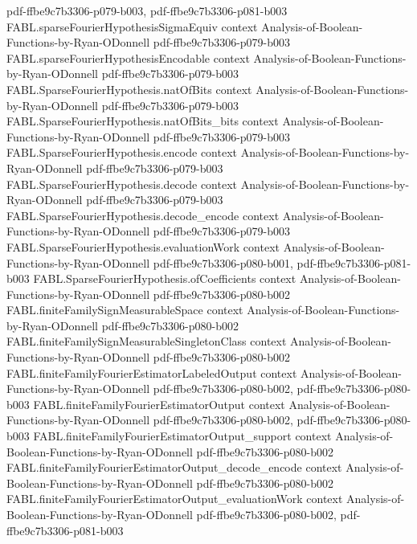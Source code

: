 \begin{theorem}
  {pdf-ffbe9c7b3306-p079-b003,
    pdf-ffbe9c7b3306-p081-b003}
\proofstep
  {FABL.sparseFourierHypothesisSigmaEquiv}
  {context}
  {Analysis-of-Boolean-Functions-by-Ryan-ODonnell}
  {pdf-ffbe9c7b3306-p079-b003}
\proofstep
  {FABL.sparseFourierHypothesisEncodable}
  {context}
  {Analysis-of-Boolean-Functions-by-Ryan-ODonnell}
  {pdf-ffbe9c7b3306-p079-b003}
\proofstep
  {FABL.SparseFourierHypothesis.natOfBits}
  {context}
  {Analysis-of-Boolean-Functions-by-Ryan-ODonnell}
  {pdf-ffbe9c7b3306-p079-b003}
\proofstep
  {FABL.SparseFourierHypothesis.natOfBits_bits}
  {context}
  {Analysis-of-Boolean-Functions-by-Ryan-ODonnell}
  {pdf-ffbe9c7b3306-p079-b003}
\proofstep
  {FABL.SparseFourierHypothesis.encode}
  {context}
  {Analysis-of-Boolean-Functions-by-Ryan-ODonnell}
  {pdf-ffbe9c7b3306-p079-b003}
\proofstep
  {FABL.SparseFourierHypothesis.decode}
  {context}
  {Analysis-of-Boolean-Functions-by-Ryan-ODonnell}
  {pdf-ffbe9c7b3306-p079-b003}
\proofstep
  {FABL.SparseFourierHypothesis.decode_encode}
  {context}
  {Analysis-of-Boolean-Functions-by-Ryan-ODonnell}
  {pdf-ffbe9c7b3306-p079-b003}
\proofstep
  {FABL.SparseFourierHypothesis.evaluationWork}
  {context}
  {Analysis-of-Boolean-Functions-by-Ryan-ODonnell}
  {pdf-ffbe9c7b3306-p080-b001,
    pdf-ffbe9c7b3306-p081-b003}
\proofstep
  {FABL.SparseFourierHypothesis.ofCoefficients}
  {context}
  {Analysis-of-Boolean-Functions-by-Ryan-ODonnell}
  {pdf-ffbe9c7b3306-p080-b002}
\proofstep
  {FABL.finiteFamilySignMeasurableSpace}
  {context}
  {Analysis-of-Boolean-Functions-by-Ryan-ODonnell}
  {pdf-ffbe9c7b3306-p080-b002}
\proofstep
  {FABL.finiteFamilySignMeasurableSingletonClass}
  {context}
  {Analysis-of-Boolean-Functions-by-Ryan-ODonnell}
  {pdf-ffbe9c7b3306-p080-b002}
\proofstep
  {FABL.finiteFamilyFourierEstimatorLabeledOutput}
  {context}
  {Analysis-of-Boolean-Functions-by-Ryan-ODonnell}
  {pdf-ffbe9c7b3306-p080-b002,
    pdf-ffbe9c7b3306-p080-b003}
\proofstep
  {FABL.finiteFamilyFourierEstimatorOutput}
  {context}
  {Analysis-of-Boolean-Functions-by-Ryan-ODonnell}
  {pdf-ffbe9c7b3306-p080-b002,
    pdf-ffbe9c7b3306-p080-b003}
\proofstep
  {FABL.finiteFamilyFourierEstimatorOutput_support}
  {context}
  {Analysis-of-Boolean-Functions-by-Ryan-ODonnell}
  {pdf-ffbe9c7b3306-p080-b002}
\proofstep
  {FABL.finiteFamilyFourierEstimatorOutput_decode_encode}
  {context}
  {Analysis-of-Boolean-Functions-by-Ryan-ODonnell}
  {pdf-ffbe9c7b3306-p080-b002}
\proofstep
  {FABL.finiteFamilyFourierEstimatorOutput_evaluationWork}
  {context}
  {Analysis-of-Boolean-Functions-by-Ryan-ODonnell}
  {pdf-ffbe9c7b3306-p080-b002,
    pdf-ffbe9c7b3306-p081-b003}

\end{theorem}
